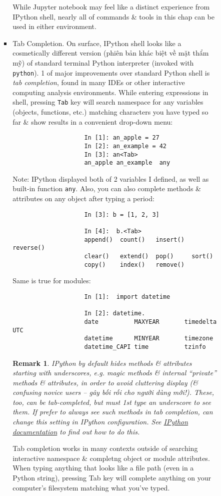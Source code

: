 \documentclass{article}
\newtheorem{remark}{Remark}
\begin{document}
\begin{enumerate}
\begin{itemize}
\begin{itemize}
\begin{itemize}
				While Jupyter notebook may feel like a distinct experience from IPython shell, nearly all of commands \& tools in this chap can be used in either environment.
				\item {\sf Tab Completion.} On surface, IPython shell looks like a cosmetically different version (phiên bản khác biệt về mặt thẩm mỹ) of standard terminal Python interpreter (invoked with {\tt python}). 1 of major improvements over standard Python shell is {\it tab completion}, found in many IDEs or other interactive computing analysis environments. While entering expressions in shell, pressing {\tt Tab} key will search namespace for any variables (objects, functions, etc.) matching characters you have typed so far \& show results in a convenient drop-down menu:
				\begin{verbatim}
					In [1]: an_apple = 27
					In [2]: an_example = 42
					In [3]: an<Tab>
					an_apple an_example  any
				\end{verbatim}
				Note: IPython displayed both of 2 variables I defined, as well as built-in function {\tt any}. Also, you can also complete methods \& attributes on any object after typing a period:
				\begin{verbatim}
					In [3]: b = [1, 2, 3]
					
					In [4]:  b.<Tab>
					append()  count()   insert()  reverse()
					clear()   extend()  pop()     sort()   
					copy()    index()   remove()           
				\end{verbatim}
				Same is true for modules:
				\begin{verbatim}
					In [1]:  import datetime
					
					In [2]: datetime.
					date          MAXYEAR       timedelta     UTC          
					datetime      MINYEAR       timezone                   
					datetime_CAPI time          tzinfo                     
				\end{verbatim}
				
				\begin{remark}
					IPython by default hides methods \& attributes starting with underscores, e.g. magic methods \& internal ``private'' methods \& attributes, in order to avoid cluttering display (\& confusing novice users -- gây bối rối cho người dùng mới!). These, too, can be tab-completed, but must 1st type an underscore to see them. If prefer to always see such methods in tab completion, can change this setting in IPython configuration. See \href{https://ipython.readthedocs.io}{IPython documentation} to find out how to do this.
				\end{remark}
				Tab completion works in many contexts outside of searching interactive namespace \& completng object or module attributes. When typing anything that looks like a file path (even in a Python string), pressing Tab key will complete anything on your computer's filesystem matching what you've typed.
				

\end{itemize}
\end{itemize}
\end{itemize}
\end{enumerate}
\end{document}
